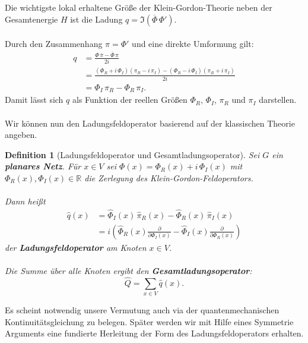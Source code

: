 \documentclass[11pt,a4paper,leqno]{report}
\newtheorem{definition}[theorem]{Definition}
\numberwithin{equation}{chapter}
\begin{document}
\noindent
Die wichtigste lokal erhaltene Größe der Klein-Gordon-Theorie neben der Gesamtenergie $H$ ist die Ladung $q = \Im(\overline{\Phi}\,\Phi')$. 
\\
\\
Durch den Zusammenhang $\pi = \Phi'$ und eine direkte Umformung gilt:
\begin{align}
	q &= \frac{\Phi\,\overline{\pi} - \overline{\Phi}\,\pi}{2i} \nonumber\\
	&= \frac{(\Phi_R + i\,\Phi_I)(\pi_R - i\,\pi_I) - (\Phi_R - i\,\Phi_I)(\pi_R + i\,\pi_I)}{2i} \nonumber\\
	&= \Phi_I\,\pi_R - \Phi_R\,\pi_I. \label{eq:KG-Ladung-reell}
\end{align}
\noindent
Damit lässt sich $q$ als Funktion der reellen Größen $\Phi_R$, $\Phi_I$, $\pi_R$ und $\pi_I$ darstellen.\\
\\
Wir können nun den Ladungsfeldoperator basierend auf der klassischen Theorie angeben.
\begin{definition}[Ladungsfeldoperator und Gesamtladungsoperator]\label{def:KG-Ladungsoperator}
	Sei $G$ ein \textbf{planares Netz}. Für $x\in V$ sei $\Phi(x) = \Phi_R(x) + i\,\Phi_I(x)$ 
	mit $\Phi_R(x),\Phi_I(x)\in\mathbb{R}$ die Zerlegung des Klein-Gordon-Feldoperators. 
	\\
	\\
	Dann heißt
	\begin{align}\label{eq:KG-Ladungsfeldoperator}
		\hat{q}(x) &= \hat{\Phi}_I(x)\,\hat{\pi}_R(x) - \hat{\Phi}_R(x)\,\hat{\pi}_I(x)\\
		&= i\left(\hat{\Phi}_R(x)\frac{\partial}{\partial \Phi_I(x)}  - \hat{\Phi}_I(x)\frac{\partial}{\partial \Phi_R(x)} \right)\nonumber
	\end{align}
	der \textbf{Ladungsfeldoperator} am Knoten $x\in V$.\\
	\\
	Die Summe über alle Knoten ergibt den \textbf{Gesamtladungsoperator}:
	\begin{equation}\label{eq:KG-Gesamtladung}
		\hat{Q} = \sum_{x\in V} \hat{q}(x).
	\end{equation}
\end{definition}
\noindent
Es scheint notwendig unsere Vermutung auch via der quantenmechanischen Kontinuit\"atsgleichung zu belegen. Sp\"ater werden wir mit Hilfe eines Symmetrie Arguments eine fundierte Herleitung der Form des Ladungsfeldoperators erhalten.
\end{document}
